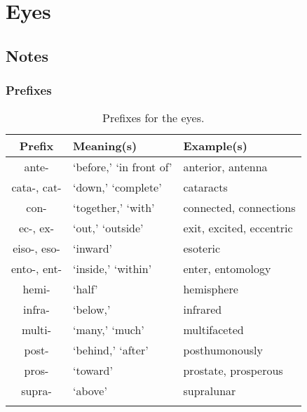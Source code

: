 %
%
%
\chapter{Eyes}
\label{Eyes} %








\abstract{}


\section{Notes}
\label{sec:NOTE5}


\subsection{Prefixes}

\begin{longtable}{c | p{} | p{}}
    \caption{Prefixes for the eyes.}
    \hline
    Prefix & Meaning(s) & Example(s) \\ \hline
        ante- & `before,' `in front of' & anterior, antenna \\
        cata-, cat- & `down,' `complete' & cataracts \\
        con- & `together,' `with' & connected, connections \\
        ec-, ex- & `out,' `outside' & exit, excited, eccentric \\
        eiso-, eso- & `inward' & esoteric \\
        ento-, ent- & `inside,' `within' & enter, entomology \\
        hemi- & `half' & hemisphere \\
        infra- & `below,' & infrared \\
        multi- & `many,' `much' & multifaceted \\
        post- & `behind,' `after' & posthumonously \\
        pros- & `toward' & prostate, prosperous \\
        supra- & `above' & supralunar \\
    \label{tab:Ch5Prefix}
\end{longtable}


